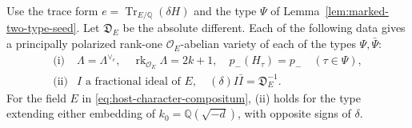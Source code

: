 \begin{auxlemma}\label{lem:marked-principal-cm-sources}
Use the trace form \(e=\operatorname{Tr}_{E/\mathbb Q}(\delta H)\)
and the type \(\Psi\) of Lemma~\ref{lem:marked-two-type-seed}.
Let \(\mathfrak D_E\) be the absolute different. Each of the
following data gives a principally polarized rank-one
\(\mathcal O_E\)-abelian variety of each of the types
\(\Psi,\bar\Psi\):
\[
 \begin{array}{ll}
 \text{(i)} &\Lambda=\Lambda^{\vee_e},\quad
             \operatorname{rk}_{\mathcal O_E}\Lambda=2k+1,\quad
             p_-(H_\tau)=p_-\quad(\tau\in\Psi),\\
 \text{(ii)}& I\text{ a fractional ideal of }E,\quad
              (\delta)I\bar I=\mathfrak D_E^{-1}.
 \end{array}
\]
For the field \(E\) in \eqref{eq:host-character-compositum},
(ii) holds for the type extending either embedding of
\(k_0=\mathbb Q(\sqrt{-d})\), with opposite signs of \(\delta\).
\end{auxlemma}
